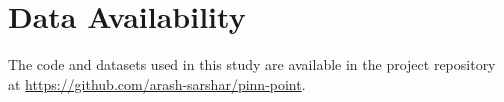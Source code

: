 \section{Data Availability}
\label{sec:data_availability}

The code and datasets used in this study are available in the project repository at \url{https://github.com/arash-sarshar/pinn-point}.
